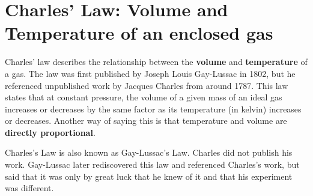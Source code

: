 
\section{Charles' Law: Volume and Temperature of an enclosed gas}

Charles' law describes the relationship between the \textbf{volume} and \textbf{temperature} of a gas. The law was first published by Joseph Louis Gay-Lussac in 1802, but he referenced unpublished work by Jacques Charles from around 1787. This law states that at constant pressure, the volume of a given mass of an ideal gas increases or decreases by the same factor as its temperature (in kelvin) increases or decreases. Another way of saying this is that temperature and volume are \textbf{directly proportional}.%



\begin{IFact}{Charles's Law is also known as Gay-Lussac's Law. Charles did not publish his work. Gay-Lussac later rediscovered this law and referenced Charles's work, but said that it was only by great luck that he knew of it and that his experiment was different.}
\end{IFact}

